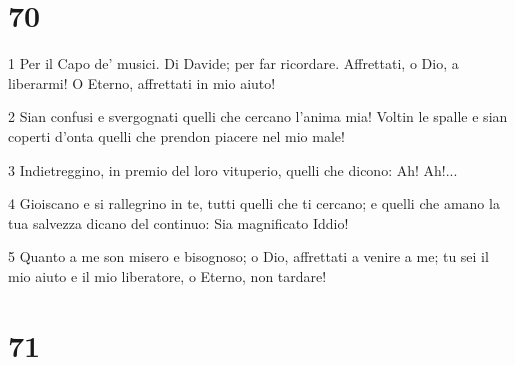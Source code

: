 \chapter{70}

\par 1 Per il Capo de' musici. Di Davide; per far ricordare. Affrettati, o Dio, a liberarmi! O Eterno, affrettati in mio aiuto!
\par 2 Sian confusi e svergognati quelli che cercano l'anima mia! Voltin le spalle e sian coperti d'onta quelli che prendon piacere nel mio male!
\par 3 Indietreggino, in premio del loro vituperio, quelli che dicono: Ah! Ah!...
\par 4 Gioiscano e si rallegrino in te, tutti quelli che ti cercano; e quelli che amano la tua salvezza dicano del continuo: Sia magnificato Iddio!
\par 5 Quanto a me son misero e bisognoso; o Dio, affrettati a venire a me; tu sei il mio aiuto e il mio liberatore, o Eterno, non tardare!

\chapter{71}

